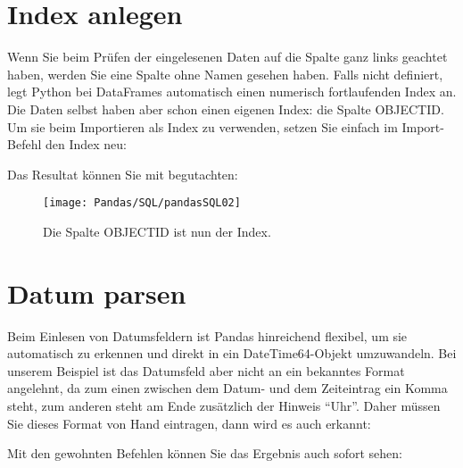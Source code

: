 \section{Index anlegen}

Wenn Sie beim Prüfen der eingelesenen Daten auf die Spalte ganz links geachtet haben, werden Sie eine Spalte ohne Namen gesehen haben. Falls nicht definiert, legt Python bei DataFrames automatisch einen numerisch fortlaufenden Index an. Die Daten selbst haben aber schon einen eigenen Index: die Spalte OBJECTID. Um sie beim Importieren als Index zu verwenden, setzen Sie einfach im Import-Befehl den Index neu:

\medskip



\medskip

Das Resultat können Sie mit  begutachten:

\begin{figure}
	\texttt{[image: Pandas/SQL/pandasSQL02]}
	\caption{Die Spalte OBJECTID ist nun der Index.}
\end{figure}


\section{Datum parsen}

Beim Einlesen von Datumsfeldern ist Pandas hinreichend flexibel, um sie automatisch zu erkennen und direkt in ein DateTime64-Objekt umzuwandeln. Bei unserem Beispiel ist das Datumsfeld aber nicht an ein bekanntes Format angelehnt, da zum einen zwischen dem Datum- und dem Zeiteintrag ein Komma steht, zum anderen steht am Ende zusätzlich der Hinweis ``Uhr''. Daher müssen Sie dieses Format von Hand eintragen, dann wird es auch erkannt:

\medskip




\medskip

Mit den gewohnten Befehlen können Sie das Ergebnis auch sofort sehen:

